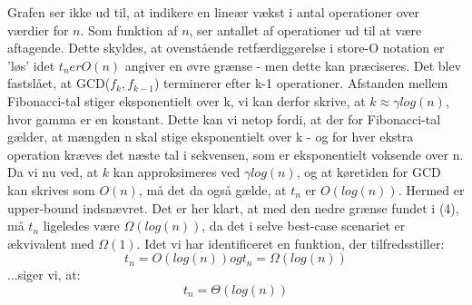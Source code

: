 \documentclass[a4paper,10pt]{article}
\begin{document}
Grafen ser ikke ud til, at indikere en lineær vækst i antal operationer over værdier for $n$. Som funktion af $n$, ser antallet af operationer ud til at være aftagende. Dette skyldes, at ovenstående retfærdiggørelse i store-O notation er 'løs' idet $t_{n} er O(n)$ angiver en øvre grænse - men dette kan præciseres. \newline 
Det blev fastslået, at GCD($f_{k},f_{k-1}$) terminerer efter k-1 operationer. Afstanden mellem Fibonacci-tal stiger eksponentielt over k, vi kan derfor skrive, at $k \approx \gamma log(n)$, hvor gamma er en konstant. Dette kan vi netop fordi, at der for Fibonacci-tal gælder, at mængden n skal stige eksponentielt over k - og for hver ekstra operation kræves det næste tal i sekvensen, som er eksponentielt voksende over n. \newline
Da vi nu ved, at $k$ kan approksimeres ved $\gamma log(n)$, og at køretiden for GCD kan skrives som $O(n)$, må det da også gælde, at $t_{n}$ er $O(log(n))$. Hermed er upper-bound indsnævret. Det er her klart, at med den nedre grænse fundet i (4), må $t_{n}$ ligeledes være $\Omega(log(n))$, da det i selve best-case scenariet er ækvivalent med $ \Omega(1)$. \newline
Idet vi har identificeret en funktion, der tilfredsstiller:
$$
t_{n} = O(log(n)) og t_{n} = \Omega(log(n))
$$
...siger vi, at:
$$
t_{n} = \Theta(log(n))
$$
\end{document}
